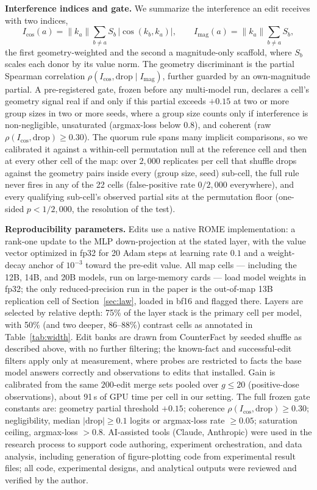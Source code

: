\documentclass[preprint,12pt]{elsarticle}
\theoremstyle{definition}
\begin{document}
\textbf{Interference indices and gate.} We summarize the interference an edit receives with
two indices,
\begin{equation}
I_{\cos}(a)=\lVert k_a\rVert\sum_{b\neq a} S_b\,\bigl|\cos(k_b,k_a)\bigr|,
\qquad
I_{\mathrm{mag}}(a)=\lVert k_a\rVert\sum_{b\neq a} S_b,
\label{eq:indices}
\end{equation}
the first geometry-weighted and the second a magnitude-only scaffold, where $S_b$ scales
each donor by its value norm. The geometry discriminant is the partial Spearman correlation
$\rho(I_{\cos},\mathrm{drop}\mid I_{\mathrm{mag}})$, further guarded by an own-magnitude
partial. A pre-registered gate, frozen before any multi-model run, declares a cell's
geometry signal real if and only if this partial exceeds $+0.15$ at two or more group
sizes in two or more seeds, where a group size counts only if interference is
non-negligible, unsaturated (argmax-loss below $0.8$), and coherent (raw
$\rho(I_{\cos},\mathrm{drop})\geq 0.30$). The quorum rule spans many implicit
comparisons, so we calibrated it against a within-cell permutation null at the
reference cell and then at every other cell of the map: over $2{,}000$ replicates
per cell that shuffle drops against the geometry pairs inside every (group size,
seed) sub-cell, the full rule never fires in any of the 22 cells (false-positive
rate $0/2{,}000$ everywhere), and every qualifying sub-cell's observed partial sits
at the permutation floor (one-sided $p<1/2{,}000$, the resolution of the test).

\textbf{Reproducibility parameters.} Edits use a native ROME implementation: a
rank-one update to the MLP down-projection at the stated layer, with the value vector
optimized in fp32 for 20 Adam steps at learning rate $0.1$ and a weight-decay anchor
of $10^{-3}$ toward the pre-edit value. All \nCells{} map cells --- including the 12B,
14B, and 20B models, run on large-memory cards --- load model weights in fp32; the only
reduced-precision run in the paper is the out-of-map 13B replication cell of
Section~\ref{sec:law}, loaded in bf16 and flagged there. Layers are selected by relative
depth: 75\% of the layer stack is the primary cell per model, with 50\% (and two
deeper, 86--88\%) contrast cells as annotated in Table~\ref{tab:width}. Edit banks are drawn from
CounterFact by seeded shuffle as described above, with no further filtering; the
known-fact and successful-edit filters apply only at measurement, where probes are
restricted to facts the base model answers correctly and observations to edits that
installed. Gain is calibrated from the same $200$-edit merge sets pooled over
$g\leq20$ (positive-dose observations), about 91\,s of GPU time per cell in our
setting. The full frozen gate constants are: geometry partial threshold $+0.15$;
coherence $\rho(I_{\cos},\mathrm{drop})\geq0.30$; negligibility, median
$|\mathrm{drop}|\geq0.1$ logits or argmax-loss rate $\geq0.05$; saturation ceiling,
argmax-loss $>0.8$. AI-assisted tools (Claude, Anthropic) were used in the research
process to support code authoring, experiment orchestration, and data analysis,
including generation of figure-plotting code from experimental result files; all code,
experimental designs, and analytical outputs were reviewed and verified by the author.
\end{document}
